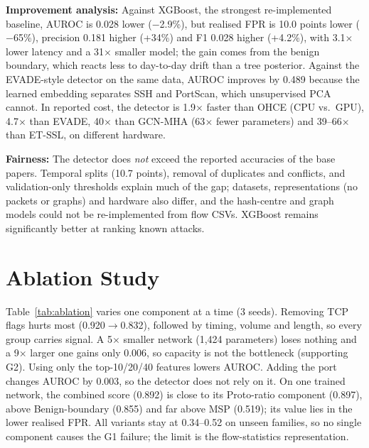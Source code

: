 \documentclass[pdflatex,sn-mathphys-num,iicol]{sn-jnl}%
\begin{document}
\textbf{Improvement analysis:} Against XGBoost, the strongest re-implemented baseline, AUROC is 0.028 lower ($-$2.9\%), but realised FPR is 10.0 points lower ($-$65\%), precision 0.181 higher (+34\%) and F1 0.028 higher (+4.2\%), with 3.1$\times$ lower latency and a 31$\times$ smaller model; the gain comes from the benign boundary, which reacts less to day-to-day drift than a tree posterior. Against the EVADE-style detector on the same data, AUROC improves by 0.489 because the learned embedding separates SSH and PortScan, which unsupervised PCA cannot. In reported cost, the detector is 1.9$\times$ faster than OHCE (CPU vs.\ GPU), 4.7$\times$ than EVADE, 40$\times$ than GCN-MHA (63$\times$ fewer parameters) and 39--66$\times$ than ET-SSL, on different hardware.

\textbf{Fairness:} The detector does \emph{not} exceed the reported accuracies of the base papers. Temporal splits (10.7 points), removal of duplicates and conflicts, and validation-only thresholds explain much of the gap; datasets, representations (no packets or graphs) and hardware also differ, and the hash-centre and graph models could not be re-implemented from flow CSVs. XGBoost remains significantly better at ranking known attacks.

\section{Ablation Study}\label{sec:ablation}

Table~\ref{tab:ablation} varies one component at a time (3 seeds). Removing TCP flags hurts most (0.920$\to$0.832), followed by timing, volume and length, so every group carries signal. A 5$\times$ smaller network (1,424 parameters) loses nothing and a 9$\times$ larger one gains only 0.006, so capacity is not the bottleneck (supporting G2). Using only the top-10/20/40 features lowers AUROC. Adding the port changes AUROC by 0.003, so the detector does not rely on it. On one trained network, the combined score (0.892) is close to its Proto-ratio component (0.897), above Benign-boundary (0.855) and far above MSP (0.519); its value lies in the lower realised FPR. All variants stay at 0.34--0.52 on unseen families, so no single component causes the G1 failure; the limit is the flow-statistics representation.
\end{document}
